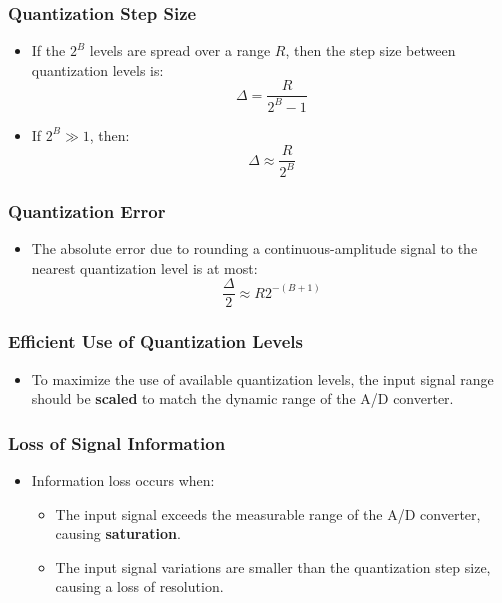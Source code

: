 \documentclass[12pt, letterpaper]{article}
\begin{document}
\subsubsection{Quantization Step Size}
\begin{itemize}
    \item If the \( 2^B \) levels are spread over a range \( R \), then the step size between quantization levels is:
    \[
    \Delta = \frac{R}{2^B - 1}
    \]
    \item If \( 2^B \gg 1 \), then:
    \[
    \Delta \approx \frac{R}{2^B}
    \]
\end{itemize}

\subsubsection{Quantization Error}
\begin{itemize}
    \item The absolute error due to rounding a continuous-amplitude signal to the nearest quantization level is at most:
    \[
    \frac{\Delta}{2} \approx R 2^{-(B+1)}
    \]
\end{itemize}

\subsubsection{Efficient Use of Quantization Levels}
\begin{itemize}
    \item To maximize the use of available quantization levels, the input signal range should be \textbf{scaled} to match the dynamic range of the A/D converter.
\end{itemize}

\subsubsection{Loss of Signal Information}
\begin{itemize}
    \item Information loss occurs when:
    \begin{itemize}
        \item The input signal exceeds the measurable range of the A/D converter, causing \textbf{saturation}.
        \item The input signal variations are smaller than the quantization step size, causing a loss of resolution.
    \end{itemize}
\end{itemize}
\end{document}

